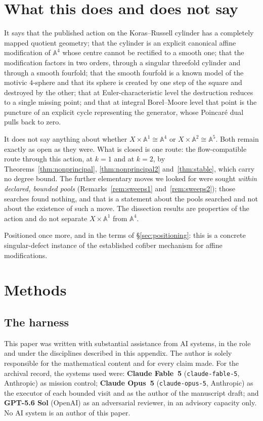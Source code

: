 \documentclass[11pt]{article}
\theoremstyle{definition}
\theoremstyle{remark}
\newcommand{\Aff}[1]{\mathbb{A}^{#1}}
\begin{document}
\section{What this does and does not say}\label{sec:scope}

It says that the published action on the Koras--Russell cylinder has a
completely mapped quotient geometry; that the cylinder is an explicit
canonical affine modification of $\Aff{4}$ whose centre cannot be rectified to
a smooth one; that the modification factors in two orders, through a singular
threefold cylinder and through a smooth fourfold; that the smooth fourfold is a
known model of the motivic $4$-sphere and that its sphere is created by one
step of the square and destroyed by the other; that at Euler-characteristic
level the destruction reduces to a single missing point; and that at integral
Borel--Moore level that point is the puncture of an explicit cycle
representing the generator, whose Poincar\'e dual pulls back to zero.

It does not say anything about whether $X\times\Aff{1}\cong\Aff{4}$ or
$X\times\Aff{2}\cong\Aff{5}$. Both remain exactly as open as they were. What
is closed is one route: the flow-compatible route through this action, at
$k=1$ and at $k=2$, by Theorems~\ref{thm:nonprincipal},
\ref{thm:nonprincipal2} and~\ref{thm:stable}, which carry no degree bound. The
further elementary moves we looked for were sought \emph{within declared,
bounded pools} (Remarks~\ref{rem:sweeps1} and~\ref{rem:sweeps2}); those
searches found nothing, and that is a statement about the pools searched and
not about the existence of such a move. The dissection results are properties
of the action and do not separate $X\times\Aff{1}$ from $\Aff{4}$.

Positioned once more, and in the terms of \S\ref{sec:positioning}: this is a
concrete singular-defect instance of the established cofiber mechanism for
affine modifications.

\appendix

\section{Methods}\label{app:methods}

\subsection{The harness}

This paper was written with substantial assistance from AI systems, in the
role and under the disciplines described in this appendix. The author is
solely responsible for the mathematical content and for every claim made. For
the archival record, the systems used were: \textbf{Claude Fable~5}
(\texttt{claude-fable-5}, Anthropic) as mission control; \textbf{Claude
Opus~5} (\texttt{claude-opus-5}, Anthropic) as the executor of each bounded
visit and as the author of the manuscript draft; and \textbf{GPT-5.6 Sol}
(OpenAI) as an adversarial reviewer, in an advisory capacity only. No AI
system is an author of this paper.
\end{document}
